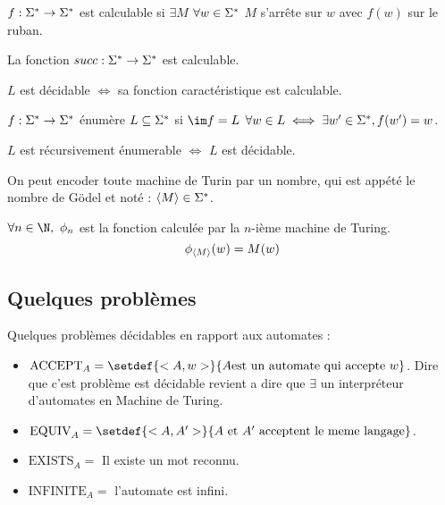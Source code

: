 \begin{definition}
	$f : \Sigma^{*} \to \Sigma^{*}$ est calculable si $\exists M$ \tq $\forall w \in \Sigma^{*}$ $M$ s'arrête sur $w$ avec $f(w)$ sur le ruban.
\end{definition}

\begin{lemma}
	La fonction $succ : \Sigma^{*} \to \Sigma^{*}$ est calculable.
\end{lemma}

\begin{prop}
	$L$ est décidable $\iff$ sa fonction caractéristique est calculable.
\end{prop}

\begin{definition}
	$f : \Sigma^{*} \to \Sigma^{*}$ énumère $L \subseteq \Sigma^{*}$ si $\im f = L$ \ie $\forall w \in L \iff \exists w' \in \Sigma^{*}, f (w') = w$.
\end{definition}

\begin{prop}
	$L$ est récursivement énumerable $\iff$ $L$ est décidable.
\end{prop}

On peut encoder toute machine de Turin par un nombre, qui est appété le nombre de Gödel et noté : $\left\langle M\right\rangle \in \Sigma^{*}$.

\begin{definition}
	$\forall n \in \N, \ \phi_n$ est la fonction calculée par la $n$-ième machine de Turing.
	$$\phi_{\left\langle M\right\rangle} (w) = M (w)$$
\end{definition}

\subsection{Quelques problèmes}

Quelques problèmes décidables en rapport aux automates :

\begin{itemize}
	\item $\text{ACCEPT}_A = \setdef {<A,w>} {A \text {est un automate qui accepte } w}$.
	      Dire que c'est problème est décidable revient a dire que $\exists$ un interpréteur d'automates en Machine de Turing.
	\item $\text{EQUIV}_A = \setdef {<A,A'>} {A \text { et } A' \text{ acceptent le meme langage}}$.
	\item $\text{EXISTS}_A = $ Il existe un mot reconnu.
	\item $\text{INFINITE}_A = $ l'automate est infini.
\end{itemize}

